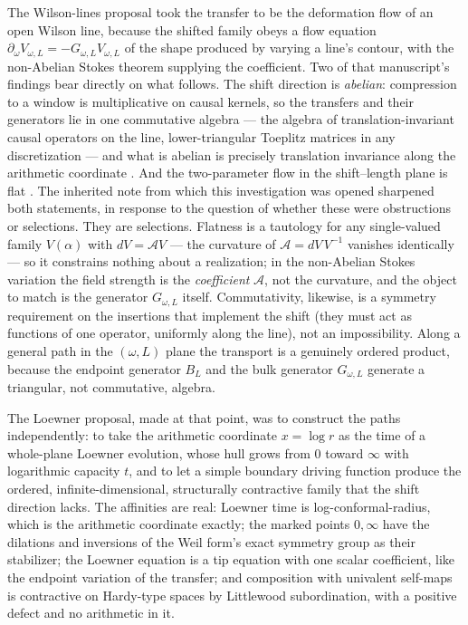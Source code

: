 The Wilson-lines proposal \cite{WilsonLines} took the transfer to be the
deformation flow of an open Wilson line, because the shifted family obeys a
flow equation $\partial_\omega V_{\omega,L}=-G_{\omega,L}V_{\omega,L}$ of the
shape produced by varying a line's contour, with the non-Abelian Stokes theorem
supplying the coefficient. Two of that manuscript's findings bear directly on
what follows. The shift direction is \emph{abelian}: compression to a window
is multiplicative on causal kernels, so the transfers and their generators lie
in one commutative algebra --- the algebra of translation-invariant causal
operators on the line, lower-triangular Toeplitz matrices in any discretization
--- and what is abelian is precisely translation invariance along the
arithmetic coordinate \cite[Theorem~5.2]{WilsonLines}. And the
two-parameter flow in the shift--length plane is flat
\cite[Proposition~9.4]{WilsonLines}. The inherited note \cite{LoewnerNote}
from which this investigation was opened sharpened both statements, in response
to the question of whether these were obstructions or selections. They are
selections. Flatness is a tautology for any single-valued family
$V(\alpha)$ with $dV=\mathcal AV$ --- the curvature of $\mathcal A=dV\,V^{-1}$
vanishes identically --- so it constrains nothing about a realization; in the
non-Abelian Stokes variation the field strength is the \emph{coefficient}
$\mathcal A$, not the curvature, and the object to match is the generator
$G_{\omega,L}$ itself. Commutativity, likewise, is a symmetry requirement on the
insertions that implement the shift (they must act as functions of one
operator, uniformly along the line), not an impossibility. Along a general path
in the $(\omega,L)$ plane the transport is a genuinely ordered product, because
the endpoint generator $B_L$ and the bulk generator $G_{\omega,L}$ generate a
triangular, not commutative, algebra.

The Loewner proposal, made at that point, was to construct the paths
independently: to take the arithmetic coordinate $x=\log r$ as the time of a
whole-plane Loewner evolution, whose hull grows from $0$ toward $\infty$ with
logarithmic capacity $t$, and to let a simple boundary driving function
produce the ordered, infinite-dimensional, structurally contractive family that
the shift direction lacks. The affinities are real: Loewner time is
log-conformal-radius, which is the arithmetic coordinate exactly; the marked
points $0,\infty$ have the dilations and inversions of the Weil form's exact
symmetry group as their stabilizer; the Loewner equation is a tip equation
with one scalar coefficient, like the endpoint variation of the transfer; and
composition with univalent self-maps is contractive on Hardy-type spaces by
Littlewood subordination, with a positive defect and no arithmetic in it.

